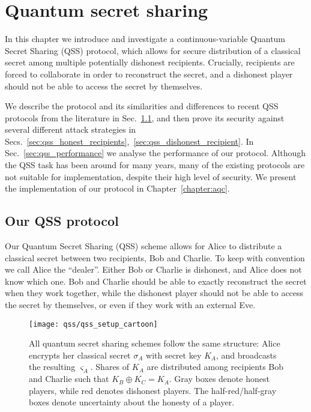 %

\chapter{Quantum secret sharing}


In this chapter we introduce and investigate a continuous-variable Quantum Secret Sharing (QSS) protocol, which allows for secure distribution of a classical secret among multiple potentially dishonest recipients. Crucially, recipients are forced to collaborate in order to reconstruct the secret, and a dishonest player should not be able to access the secret by themselves.

We describe the protocol and its similarities and differences to recent QSS protocols from the literature in Sec.~\ref{sec:qss_our_protocol}, and then prove its security against several different attack strategies in Secs.~\ref{sec:qss_honest_recipients},~\ref{sec:qss_dishonest_recipient}. In Sec.~\ref{sec:qss_performance} we analyse the performance of our protocol. Although the QSS task has been around for many years, many of the existing protocols are not suitable for implementation, despite their high level of security. We present the implementation of our protocol in Chapter~\ref{chapter:aqc}.

\section{Our QSS protocol}\label{sec:qss_our_protocol}

Our Quantum Secret Sharing (QSS) scheme allows for Alice to distribute a classical secret between two recipients, Bob and Charlie. To keep with convention we call Alice the ``dealer''. Either Bob or Charlie is dishonest, and Alice does not know which one. Bob and Charlie should be able to exactly reconstruct the secret when they work together, while the dishonest player should not be able to access the secret by themselves, or even if they work with an external Eve.


\begin{figure}[htp]
\captionsetup{width=0.8\linewidth}
\centering
\texttt{[image: qss/qss\_setup\_cartoon]}
\caption{\label{fig:qss_structure} All quantum secret sharing schemes follow the same structure: Alice encrypts her classical secret $\sigma_A$ with secret key $K_A$, and broadcasts the resulting $\varsigma_A$. Shares of $K_A$ are distributed among recipients Bob and Charlie such that $K_B \oplus K_C = K_A$. Gray boxes denote honest players, while red denotes dishonest players. The half-red/half-gray boxes denote uncertainty about the honesty of a player. %
}
\end{figure}

